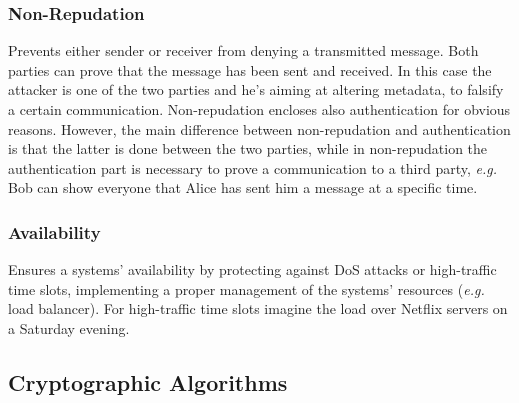 \documentclass[oneside]{academica}
\begin{document}
\subsubsection{Non-Repudation}

Prevents either sender or receiver from denying a transmitted message.
Both parties can prove that the message has been sent and received.
In this case the attacker is one of the two parties and he's aiming at altering metadata, to falsify a certain communication.
Non-repudation encloses also authentication for obvious reasons.
However, the main difference between non-repudation and authentication is that the latter is done between the two parties, while in non-repudation the authentication part is necessary to prove a communication to a third party, \textit{e.g.} Bob can show everyone that Alice has sent him a message at a specific time.

\subsubsection{Availability}

Ensures a systems' availability by protecting against DoS attacks or high-traffic time slots, implementing a proper management of the systems' resources (\textit{e.g.} load balancer).
For high-traffic time slots imagine the load over Netflix servers on a Saturday evening.

\subsection{Cryptographic Algorithms}
\end{document}
